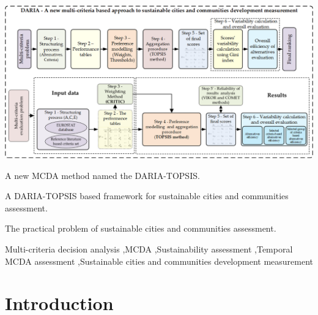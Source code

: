 \documentclass[final,5p,times,twocolumn,authoryear]{elsarticle}
\begin{document}
\begin{frontmatter}
\begin{graphicalabstract}
\includegraphics[width=\linewidth]{SCSabs_graficzny_nowy.png}
\end{graphicalabstract}

\begin{highlights}
\item A new MCDA method named the DARIA-TOPSIS.
\item A DARIA-TOPSIS based framework for sustainable cities and communities assessment.
\item The practical problem of sustainable cities and communities assessment.
\end{highlights}


\begin{keyword}


Multi-criteria decision analysis \sep MCDA \sep Sustainability assessment \sep Temporal MCDA assessment \sep Sustainable cities and communities development measurement
\end{keyword}

\end{frontmatter}


\section{Introduction}


\end{document}
